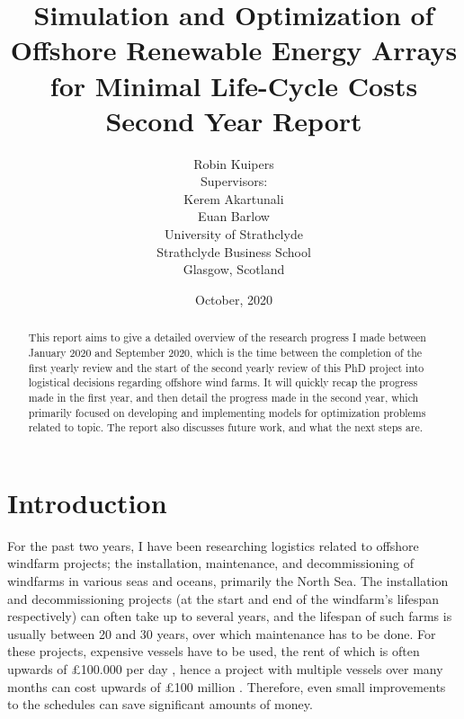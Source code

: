 \documentclass[a4paper,12pt]{article}
\begin{document}
\title{Simulation and Optimization of Offshore Renewable Energy Arrays for Minimal Life-Cycle Costs \\
\large Second Year Report}
\author{Robin Kuipers \\[1cm] Supervisors: \\ Kerem Akartunali \\ Euan Barlow\\[2cm] University of Strathclyde \\ Strathclyde Business School \\ {\small Glasgow, Scotland}}
\date{October, 2020}

\maketitle

\pagebreak

\begin{abstract}
This report aims to give a detailed overview of the research progress I made between January 2020 and September 2020, which is the time between the completion of the first yearly review and the start of the second yearly review of this PhD project into logistical decisions regarding offshore wind farms. It will quickly recap the progress made in the first year, and then detail the progress made in the second year, which primarily focused on developing and implementing models for optimization problems related to topic. The report also discusses future work, and what the next steps are. 
\end{abstract}

\pagebreak

\tableofcontents

\pagebreak

\section{Introduction}\label{ss:omtrp}
For the past two years, I have been researching logistics related to offshore windfarm projects; the installation, maintenance, and decommissioning of windfarms in various seas and oceans, primarily the North Sea. The installation and decommissioning projects (at the start and end of the windfarm's lifespan respectively) can often take up to several years, and the lifespan of such farms is usually between 20 and 30 years, over which maintenance has to be done. For these projects, expensive vessels have to be used, the rent of which is often upwards of \pounds 100.000 per day \cite{barlow2014support}, hence a project with multiple vessels over many months can cost upwards of \pounds 100 million \cite{kaiser2010offshore}. Therefore, even small improvements to the schedules can save significant amounts of money.
\end{document}
